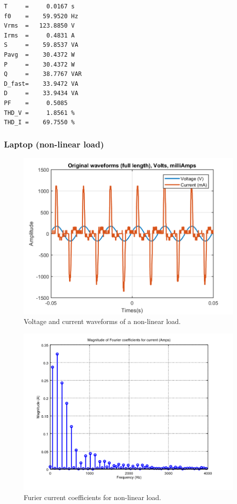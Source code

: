 \documentclass[journal]{IEEEtran}
\begin{document}
\begin{lstlisting}
T     =     0.0167 s 
f0    =    59.9520 Hz 
Vrms  =   123.8850 V
Irms  =     0.4831 A
S     =    59.8537 VA
Pavg  =    30.4372 W 
P     =    30.4372 W 
Q     =    38.7767 VAR 
D_fast=    33.9472 VA 
D     =    33.9434 VA 
PF    =     0.5085 
THD_V =     1.8561 %
THD_I =    69.7550 %
\end{lstlisting}

\subsubsection{Laptop (non-linear load)}

\begin{figure}[h]
\centering
\includegraphics[clip,width=\columnwidth]{original_waveform_computer.png}
\caption{Voltage and current waveforms of a non-linear load.}
\label{original_no_lineal_load}
\end{figure}

\begin{figure}[h]
\centering
\includegraphics[clip,width=\columnwidth]{zoomed_current_furier_coefficients_computer.png}
\caption{Furier current coefficients for non-linear load.}
\label{fourier_corrent_coefficients_nonlinear}
\end{figure}
\end{document}

